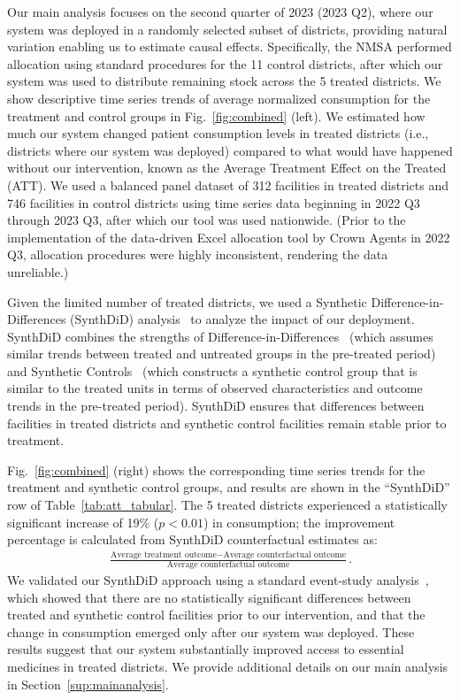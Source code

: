 \documentclass[12pt]{article}
\begin{document}
Our main analysis focuses on the second quarter of 2023 (2023 Q2), where our system was deployed in a randomly selected subset of districts, providing natural variation enabling us to estimate causal effects. Specifically, the NMSA performed allocation using standard procedures for the 11 control districts, after which our system was used to distribute remaining stock across the 5 treated districts. We show descriptive time series trends of average normalized consumption for the treatment and control groups in Fig.~\ref{fig:combined} (left). We estimated how much our system changed patient consumption levels in treated districts (i.e., districts where our system was deployed) compared to what would have happened without our intervention, known as the Average Treatment Effect on the Treated (ATT). We used a balanced panel dataset of 312 facilities in treated districts and 746 facilities in control districts using time series data beginning in 2022 Q3 through 2023 Q3, after which our tool was used nationwide. (Prior to
the implementation of the data-driven Excel allocation tool by Crown Agents in 2022 Q3, allocation procedures were highly inconsistent, rendering the data unreliable.)

Given the limited number of treated districts, we used a Synthetic Difference-in-Differences (SynthDiD) analysis~\cite{arkhangelsky2021synthetic} to analyze the impact of our deployment. SynthDiD combines the strengths of Difference-in-Differences~\cite{card1993minimum} (which assumes similar trends between treated and untreated groups in the pre-treated period) and Synthetic Controls~\cite{abadie2010synthetic}
(which constructs a synthetic control group that is similar to the treated units in terms of observed characteristics and outcome trends in the pre-treated period). SynthDiD ensures that differences between facilities in treated districts and synthetic control facilities remain stable prior to treatment.

Fig.~\ref{fig:combined} (right) shows the corresponding time series trends for the treatment and synthetic control groups, and results are shown in the ``SynthDiD'' row of Table~\ref{tab:att_tabular}. The 5 treated districts experienced a statistically significant increase of 19\% ($p<0.01$) in consumption; the improvement percentage is calculated from SynthDiD counterfactual estimates as:
\begin{align*}
\frac{\text{Average treatment outcome} - \text{Average counterfactual outcome}}{\text{Average counterfactual outcome}}.
\end{align*}
We validated our SynthDiD approach using a standard event-study analysis~\cite{clarke2023synthetic}, which showed that there are no statistically significant differences between treated and synthetic control facilities prior to our intervention, and that the change in consumption emerged only after our system was deployed. These results suggest that our system substantially improved access to essential medicines in treated districts. We provide additional details on our main analysis in Section~\ref{sup:mainanalysis}.
\end{document}
